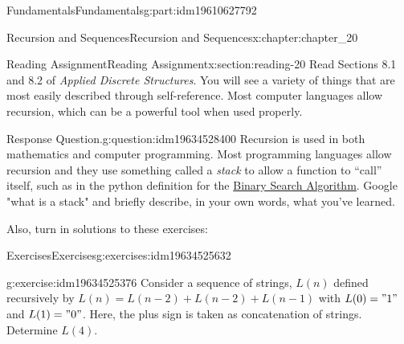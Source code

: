 \documentclass[oneside,10pt,]{book}
\numberwithin{equation}{section}
\begin{document}
\begin{partptx}{Fundamentals}{}{Fundamentals}{}{}{g:part:idm19610627792}
%
\begin{chapterptx}{Recursion and Sequences}{}{Recursion and Sequences}{}{}{x:chapter:chapter_20}
%
%
%
%
\typeout{************************************************}
\typeout{************************************************}
%
\begin{sectionptx}{Reading Assignment}{}{Reading Assignment}{}{}{x:section:reading-20}
Read  Sections 8.1 and 8.2 of \emph{Applied Discrete Structures}.  You will see a variety of things that are most easily described through self-reference.  Most computer languages allow recursion, which can be a powerful tool when used properly.%
\begin{question}{Response Question.}{g:question:idm19634528400}%
Recursion is used in both mathematics and computer programming. Most programming languages allow recursion and they use something called a \emph{stack} to allow a function to ``call'' itself, such as in the python definition for the \hyperref[x:section:s-bsa]{Binary Search Algorithm}.  Google "what is a stack" and briefly describe, in your own words, what you've learned.%
\end{question}
Also, turn in solutions to these exercises:%
%
%
\typeout{************************************************}
\typeout{************************************************}
%
\begin{exercises-subsection-numberless}{Exercises}{}{Exercises}{}{}{g:exercises:idm19634525632}
\par\medskip\noindent%
%
\begin{exercisegroup}
\begin{divisionexerciseeg}{1}{}{}{g:exercise:idm19634525376}%
Consider a sequence of strings, \(L(n)\) defined recursively by \(L(n)=L(n-2)+L(n-2)+L(n-1)\) with \(L(0)="1"\) and \(L(1)="0"\). Here, the plus sign is taken as concatenation of strings.  Determine \(L(4)\).%
\end{divisionexerciseeg}%
\end{exercisegroup}
\end{exercises-subsection-numberless}
\end{sectionptx}
\end{chapterptx}
\end{partptx}
\end{document}

